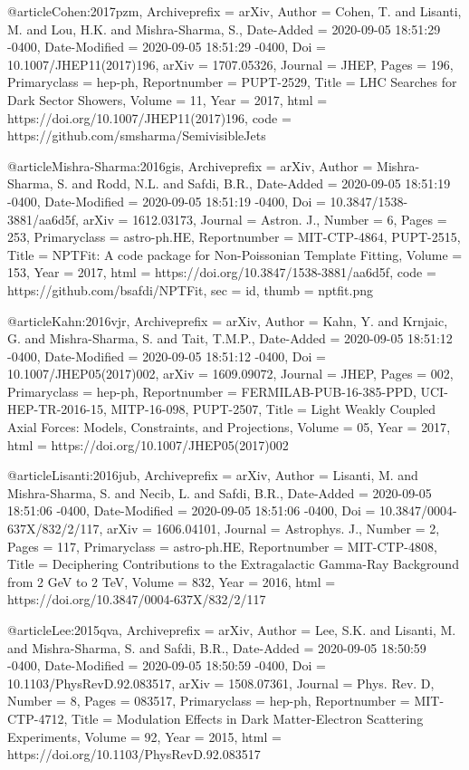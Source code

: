@article{Cohen:2017pzm,
	Archiveprefix = {arXiv},
	Author = {Cohen, T. and Lisanti, M. and Lou, H.K. and Mishra-Sharma, S.},
	Date-Added = {2020-09-05 18:51:29 -0400},
	Date-Modified = {2020-09-05 18:51:29 -0400},
	Doi = {10.1007/JHEP11(2017)196},
	arXiv = {1707.05326},
	Journal = {JHEP},
	Pages = {196},
	Primaryclass = {hep-ph},
	Reportnumber = {PUPT-2529},
	Title = {{LHC Searches for Dark Sector Showers}},
	Volume = {11},
	Year = {2017},
	html = {https://doi.org/10.1007/JHEP11(2017)196},
  	code = {https://github.com/smsharma/SemivisibleJets}}

@article{Mishra-Sharma:2016gis,
	Archiveprefix = {arXiv},
	Author = {Mishra-Sharma, S. and Rodd, N.L. and Safdi, B.R.},
	Date-Added = {2020-09-05 18:51:19 -0400},
	Date-Modified = {2020-09-05 18:51:19 -0400},
	Doi = {10.3847/1538-3881/aa6d5f},
	arXiv = {1612.03173},
	Journal = {Astron. J.},
	Number = {6},
	Pages = {253},
	Primaryclass = {astro-ph.HE},
	Reportnumber = {MIT-CTP-4864, PUPT-2515},
	Title = {{NPTFit: A code package for Non-Poissonian Template Fitting}},
	Volume = {153},
	Year = {2017},
	html = {https://doi.org/10.3847/1538-3881/aa6d5f},
  	code = {https://github.com/bsafdi/NPTFit},
  	sec = {id},
	thumb = {nptfit.png}}

@article{Kahn:2016vjr,
	Archiveprefix = {arXiv},
	Author = {Kahn, Y. and Krnjaic, G. and Mishra-Sharma, S. and Tait, T.M.P.},
	Date-Added = {2020-09-05 18:51:12 -0400},
	Date-Modified = {2020-09-05 18:51:12 -0400},
	Doi = {10.1007/JHEP05(2017)002},
	arXiv = {1609.09072},
	Journal = {JHEP},
	Pages = {002},
	Primaryclass = {hep-ph},
	Reportnumber = {FERMILAB-PUB-16-385-PPD, UCI-HEP-TR-2016-15, MITP-16-098, PUPT-2507},
	Title = {{Light Weakly Coupled Axial Forces: Models, Constraints, and Projections}},
	Volume = {05},
	Year = {2017},
	html = {https://doi.org/10.1007/JHEP05(2017)002}}

@article{Lisanti:2016jub,
	Archiveprefix = {arXiv},
	Author = {Lisanti, M. and Mishra-Sharma, S. and Necib, L. and Safdi, B.R.},
	Date-Added = {2020-09-05 18:51:06 -0400},
	Date-Modified = {2020-09-05 18:51:06 -0400},
	Doi = {10.3847/0004-637X/832/2/117},
	arXiv = {1606.04101},
	Journal = {Astrophys. J.},
	Number = {2},
	Pages = {117},
	Primaryclass = {astro-ph.HE},
	Reportnumber = {MIT-CTP-4808},
	Title = {{Deciphering Contributions to the Extragalactic Gamma-Ray Background from 2 GeV to 2 TeV}},
	Volume = {832},
	Year = {2016},
	html = {https://doi.org/10.3847/0004-637X/832/2/117}}

@article{Lee:2015qva,
	Archiveprefix = {arXiv},
	Author = {Lee, S.K. and Lisanti, M. and Mishra-Sharma, S. and Safdi, B.R.},
	Date-Added = {2020-09-05 18:50:59 -0400},
	Date-Modified = {2020-09-05 18:50:59 -0400},
	Doi = {10.1103/PhysRevD.92.083517},
	arXiv = {1508.07361},
	Journal = {Phys. Rev. D},
	Number = {8},
	Pages = {083517},
	Primaryclass = {hep-ph},
	Reportnumber = {MIT-CTP-4712},
	Title = {{Modulation Effects in Dark Matter-Electron Scattering Experiments}},
	Volume = {92},
	Year = {2015},
	html = {https://doi.org/10.1103/PhysRevD.92.083517}}
